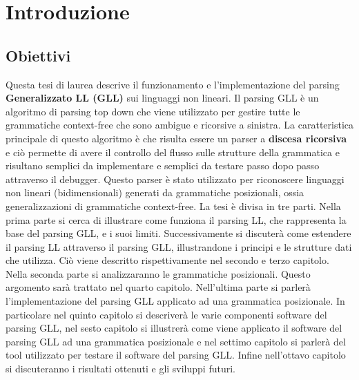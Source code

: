 \chapter{Introduzione}
\section{Obiettivi}
Questa tesi di laurea descrive il funzionamento e l'implementazione del parsing \textbf{Generalizzato LL (GLL)} sui linguaggi non lineari. Il parsing GLL è un algoritmo di parsing top down che viene utilizzato per gestire tutte le grammatiche context-free che sono ambigue e ricorsive a sinistra. La caratteristica principale di questo algoritmo è che risulta essere un parser a \textbf{discesa ricorsiva} e ciò permette di avere il controllo del flusso sulle strutture della grammatica e risultano semplici da implementare e semplici da testare passo dopo passo attraverso il debugger. Questo parser è stato utilizzato per riconoscere linguaggi non lineari (bidimensionali) generati da grammatiche posizionali, ossia generalizzazioni di grammatiche context-free. La tesi è divisa in tre parti. Nella prima parte si cerca di illustrare come funziona il parsing LL, che rappresenta la base del parsing GLL, e i suoi limiti. Successivamente si  discuterà come estendere il parsing LL attraverso il parsing GLL, illustrandone i principi e le strutture dati che utilizza. Ciò viene descritto rispettivamente nel secondo e terzo capitolo. Nella seconda parte si analizzaranno le grammatiche posizionali. Questo argomento sarà trattato nel quarto capitolo. Nell'ultima parte si parlerà l'implementazione del parsing GLL applicato ad una grammatica posizionale. In particolare nel quinto capitolo si descriverà le varie  componenti software del parsing GLL, nel sesto capitolo si illustrerà come viene applicato il software del parsing GLL ad una grammatica posizionale e nel settimo capitolo si parlerà del tool utilizzato per testare il software del parsing GLL. Infine nell'ottavo capitolo si discuteranno i risultati ottenuti e gli sviluppi futuri.

